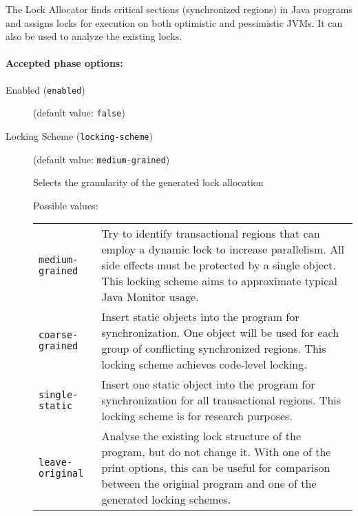 \documentclass{article}
\begin{document}
The Lock Allocator finds critical sections (synchronized regions)
in Java programs and assigns locks for execution on both
optimistic and pessimistic JVMs.  It can also be used to analyze the existing
locks.


\paragraph{Accepted phase options:} 

\begin{description}

\item[Enabled ({\tt enabled})]
(default value: {\tt false})






\item[Locking Scheme ({\tt locking-scheme})]
(default value: {\tt medium-grained})



Selects the granularity of the generated lock allocation



Possible values:\\
\begin{longtable}{p{1in}p{4in}}

{\tt medium-grained }
&

Try to identify transactional regions that can employ a dynamic lock to
increase parallelism.  All side effects must be protected by a single object.
This locking scheme aims to approximate typical Java Monitor usage.
\\

{\tt coarse-grained }
&

Insert static objects into the program for synchronization.  One object will be
used for each group of conflicting synchronized regions.  This locking scheme
achieves code-level locking.
\\

{\tt single-static }
&

Insert one static object into the program for synchronization for all
transactional regions.  This locking scheme is for research purposes.
\\

{\tt leave-original }
&

Analyse the existing lock structure of the program, but do not change it.  With
one of the print options, this can be useful for comparison between the original
program and one of the generated locking schemes.
\\


\end{longtable}
\end{description}
\end{document}
